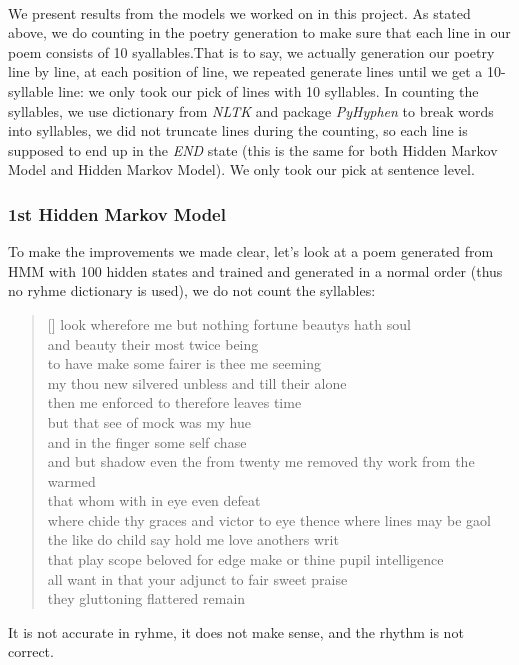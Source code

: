 %
\paragraph{}
We present results from the models we worked on in this project. As stated above, we do counting in the poetry generation to make sure that each line in our poem consists of 10 syallables.That is to say, we actually generation our poetry line by line, at each position of line, we repeated generate lines until we get a 10-syllable line: we only took our pick of lines with 10 syllables. In counting the syllables, we use dictionary from \textit{NLTK} and package \textit{PyHyphen} to break words into syllables, we did not truncate lines during the counting, so each line is supposed to end up in the \textit{END} state (this is the same for both Hidden Markov Model and Hidden Markov Model). We only took our pick at sentence level.
\subsubsection{1st Hidden Markov Model}
To make the improvements we made clear, let's look at a poem generated from HMM with 100 hidden states and trained and generated in a normal order (thus no ryhme dictionary is used), we do not count the syllables:
\settowidth{\versewidth}{even  see  shall  accessary  used  must  find  and  herself  enfeebled  mine  it}

\begin{verse}[\versewidth]
 look  wherefore  me  but  nothing  fortune  beautys  hath  soul\\
 and  beauty  their  most  twice  being \\
 to  have  make  some  fairer  is  thee  me  seeming \\
 my  thou  new  silvered  unbless  and  till  their  alone \\
 then  me  enforced  to  therefore  leaves  time \\
 but  that  see  of  mock  was  my  hue \\
 and  in  the  finger  some  self  chase \\
 and  but  shadow  even  the  from  twenty  me  removed  thy  work  from  the  warmed \\
 that  whom  with  in  eye  even  defeat \\
 where  chide  thy  graces  and  victor  to  eye  thence  where  lines  may  be  gaol \\
 the  like  do  child  say  hold  me  love  anothers  writ \\
 that  play  scope  beloved  for  edge  make  or  thine  pupil  intelligence \\
 all  want  in  that  your  adjunct  to  fair  sweet  praise \\
 they  gluttoning  flattered  remain \\
\end{verse}
It is not accurate in ryhme, it does not make sense, and the rhythm is not correct.
